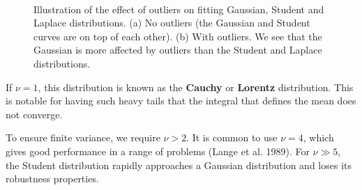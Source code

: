 \documentclass[graybox, envcountchap, twocolumn]{styles/svmult}
\begin{document}
\begin{figure}[hbtp]
\centering
{} \\
\caption{Illustration of the effect of outliers on fitting Gaussian, Student and Laplace distributions. (a) No outliers (the Gaussian and Student curves are on top of each other). (b) With outliers. We see that the Gaussian is more affected by outliers than the Student and Laplace distributions.}
\label{fig:robustness} 
\end{figure}

If $\nu=1$, this distribution is known as the \textbf{Cauchy} or \textbf{Lorentz} distribution. This is notable for having such heavy tails that the integral that defines the mean does not converge.

To ensure finite variance, we require $\nu>2$. It is common to use $\nu=4$, which gives good performance in a range of problems (Lange et al. 1989). For $\nu \gg 5$, the Student distribution rapidly approaches a Gaussian distribution and loses its robustness properties.
\end{document}
